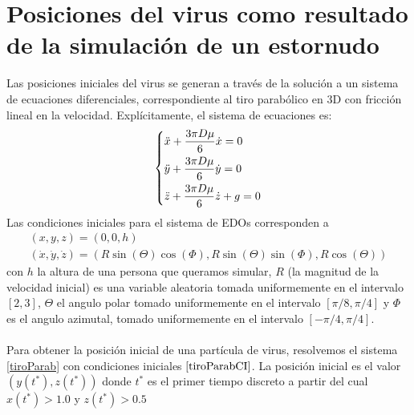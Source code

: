 \documentclass[11pt]{article}
\begin{document}
\section{Posiciones del virus como resultado de la simulación de un estornudo}
Las posiciones iniciales del virus se generan a través de la solución a un sistema de ecuaciones diferenciales, correspondiente al tiro parabólico en 3D con fricción lineal en la velocidad. Explícitamente, el sistema de ecuaciones es:
\begin{equation}
    \begin{dcases}
        \label{tiroParab}
        \ddot{x}+ \frac{3\pi D \mu}{6} \dot{x} = 0  \\ 
        \ddot{y}+\frac{3\pi D \mu}{6} \dot{y} = 0  \\ 
        \ddot{z}+\frac{3\pi D \mu}{6} \dot{z} + g = 0  \\ 
    \end{dcases}
\end{equation}
Las condiciones iniciales para el sistema de EDOs corresponden a
\begin{equation}
    \begin{gathered}
        \label{tiroParabCI}
        (x,y,z) = (0,0,h) \\
        (\dot{x},\dot{y},\dot{z}) = (R\sin(\Theta)\cos(\Phi),R\sin(\Theta)\sin(\Phi),R\cos(\Theta))
    \end{gathered}        
\end{equation}
con $h$ la altura de una persona que queramos simular, $R$ (la magnitud de la velocidad inicial) es una variable aleatoria tomada uniformemente en el intervalo $[2,3]$, $\Theta$ el angulo polar tomado uniformemente en el intervalo $[\pi/8,\pi/4]$ y $\Phi$ es el angulo azimutal, tomado uniformemente en el intervalo  $[-\pi/4,\pi/4]$.
\\
\\Para obtener la posición inicial de una partícula de virus, resolvemos el sistema \ref{tiroParab} con condiciones iniciales $\ref{tiroParabCI}$. La posición inicial es el valor $(y(t^*),z(t^*))$ donde $t^*$ es el primer tiempo discreto a partir del cual $x(t^*) > 1.0$ y $z(t^*) > 0.5$
\end{document}
